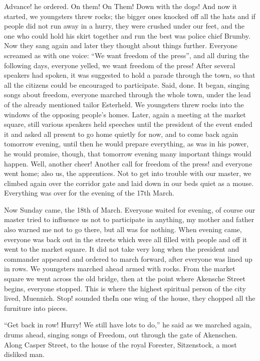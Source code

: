 \documentclass{article}
\begin{document}
Advance! he ordered. On them! On Them! Down with the dogs! And now it started, we youngsters threw rocks; the bigger ones knocked off all the hats and if people did not run away in a hurry, they were crushed under our feet, and the one who could hold his skirt together and run the best was police chief Brumby. Now they sang again and later they thought about things further. Everyone screamed as with one voice: ``We want freedom of the press'', and all during the following days, everyone yelled, we want freedom of the press! After several speakers had spoken, it was suggested to hold a parade through the town, so that all the citizens could be encouraged to participate. Said, done. It began, singing songs about freedom, everyone marched through the whole town, under the lead of the already mentioned tailor Esterheld. We youngsters threw rocks into the windows of the opposing people's homes. Later, again a meeting at the market square, still various speakers held speeches until the president of the event ended it and asked all present to go home quietly for now, and to come back again tomorrow evening, until then he would prepare everything, as was in his power, he would promise, though, that tomorrow evening many important things would happen. Well, another cheer! Another call for freedom of the press! and everyone went home; also us, the apprentices. Not to get into trouble with our master, we climbed again over the corridor gate and laid down in our beds quiet as a mouse. Everything was over for the evening of the 17th March.

Now Sunday came, the 18th of March. Everyone waited for evening, of course our master tried to influence us not to participate in anything, my mother and father also warned me not to go there, but all was for nothing. When evening came, everyone was back out in the streets which were all filled with people and off it went to the market square. It did not take very long when the president and commander appeared and ordered to march forward, after everyone was lined up in rows. We youngsters marched ahead armed with rocks. From the market square we went across the old bridge, then at the point where Akensche Street begins, everyone stopped. This is where the highest spiritual person of the city lived, Muennich. Stop! sounded theIn one wing of the house, they chopped all the furniture into pieces.

``Get back in row! Hurry! We still have lots to do,'' he said as we marched again, drums ahead, singing songs of Freedom, out through the gate of Akenschen. Along Casper Street, to the house of the royal Forester, Sitzenstock, a most disliked man.
\end{document}

